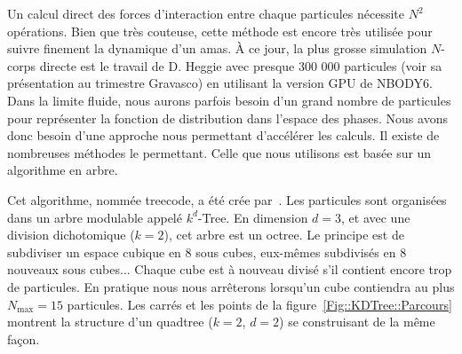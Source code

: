 			Un calcul direct des forces d'interaction entre chaque particules nécessite $N^2$ opérations. Bien que très couteuse, cette
			méthode est encore très utilisée pour suivre finement la dynamique d'un amas. À ce jour, la plus grosse simulation $N$-corps
			directe est le travail de D. Heggie avec presque 300 000 particules (voir sa présentation au trimestre Gravasco) en utilisant
			la version GPU de NBODY6. Dans la limite fluide, nous aurons parfois besoin d'un grand nombre de particules pour représenter
			la fonction de distribution dans l'espace des phases. Nous avons donc besoin d'une approche nous permettant d'accélérer les
			calculs. Il existe de nombreuses méthodes le permettant. Celle que nous utilisons est basée sur un algorithme en arbre.



			Cet algorithme, nommée \og treecode\fg, a été crée par~\cite{1986Natur.324..446B}.
			Les particules sont
			organisées dans un arbre modulable appelé $k^d$-Tree. En dimension $d=3$, et avec une division dichotomique
			($k=2$), cet arbre est un octree. Le principe est de subdiviser un espace cubique en 8 sous cubes, eux-mêmes subdivisés en 8
			nouveaux sous cubes... Chaque cube est à nouveau divisé s'il contient encore trop de particules.
			En pratique nous nous arrêterons lorsqu'un cube contiendra au plus $N_\mathrm{max}=15$ particules. Les carrés et les points
			de la figure~\ref{Fig::KDTree::Parcours} montrent la structure d'un quadtree ($k=2$, $d=2$) se construisant de la même façon.

